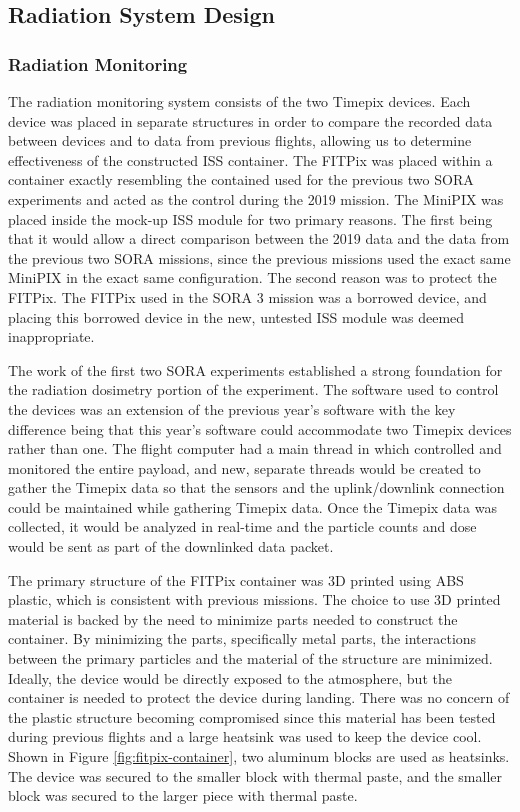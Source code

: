 \subsection{Radiation System Design}
\label{sec:Radiation-Design}

\subsubsection{Radiation Monitoring}
The radiation monitoring system consists of the two Timepix devices.
Each device was placed in separate structures in order to compare the recorded data between devices and to data from previous flights, allowing us to determine effectiveness of the constructed ISS container.
The FITPix was placed within a container exactly resembling the contained used for the previous two SORA experiments and acted as the control during the 2019 mission.
The MiniPIX was placed inside the mock-up ISS module for two primary reasons.
The first being that it would allow a direct comparison between the 2019 data and the data from the previous two SORA missions, since the previous missions used the exact same MiniPIX in the exact same configuration.
The second reason was to protect the FITPix.
The FITPix used in the SORA 3 mission was a borrowed device, and placing this borrowed device in the new, untested ISS module was deemed inappropriate.

The work of the first two SORA experiments established a strong foundation for the radiation dosimetry portion of the experiment.
The software used to control the devices was an extension of the previous year's software with the key difference being that this year's software could accommodate two Timepix devices rather than one. 
The flight computer had a main thread in which controlled and monitored the entire payload, and new, separate threads would be created to gather the Timepix data so that the sensors and the uplink/downlink connection could be maintained while gathering Timepix data.
Once the Timepix data was collected, it would be analyzed in real-time and the particle counts and dose would be sent as part of the downlinked data packet. 

The primary structure of the FITPix container was 3D printed using ABS plastic, which is consistent with previous missions.
The choice to use 3D printed material is backed by the need to minimize parts needed to construct the container.
By minimizing the parts, specifically metal parts, the interactions between the primary particles and the material of the structure are minimized.
Ideally, the device would be directly exposed to the atmosphere, but the container is needed to protect the device during landing. 
There was no concern of the plastic structure becoming compromised since this material has been tested during previous flights and a large heatsink was used to keep the device cool.
Shown in Figure \ref{fig:fitpix-container}, two aluminum blocks are used as heatsinks.
The device was secured to the smaller block with thermal paste, and the smaller block was secured to the larger piece with thermal paste. 

